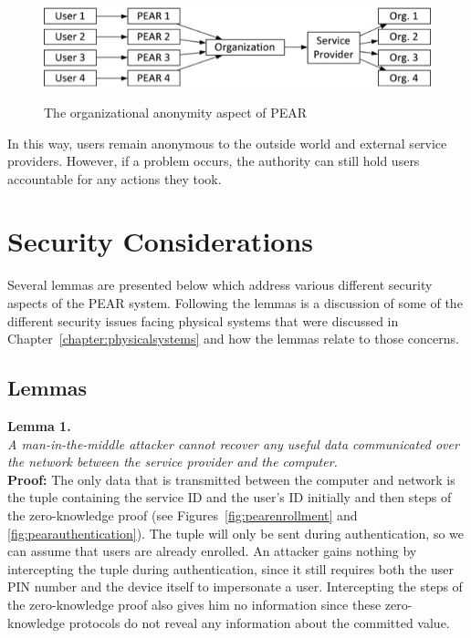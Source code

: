 \begin{figure}[!ht]
\includegraphics[width=500px]{images/pearorgnaizational.jpg}
\label{fig:pearorganizational}
\caption{The organizational anonymity aspect of PEAR}
\end{figure}
\FloatBarrier

In this way, users remain anonymous to the outside world and external service providers. However, if a problem occurs,
the authority can still hold users accountable for any actions they took.

\section{Security Considerations}
Several lemmas are presented below which address various different security aspects of the PEAR system.
Following the lemmas is a discussion of some of the different security issues facing physical systems that
were discussed in Chapter~\ref{chapter:physicalsystems} and how the lemmas relate to those concerns.

\subsection{Lemmas}
\noindent \textbf{Lemma 1.} \\
\noindent \emph{A man-in-the-middle attacker cannot recover any useful data communicated over the network between the
service provider and the computer.} \\
{\bf Proof:}  The only data that is transmitted between the computer and network is the tuple containing the service
ID and the user's ID initially and then steps of the zero-knowledge proof (see Figures~\ref{fig:pearenrollment} and
\ref{fig:pearauthentication}). The tuple will only be sent during authentication, so we can assume that users are already enrolled.
An attacker gains nothing by intercepting the tuple during authentication, since it still requires both the user PIN
number and the device itself to impersonate a user. Intercepting the steps of the zero-knowledge proof also gives him
no information since these zero-knowledge protocols do not reveal any information about the committed value.

